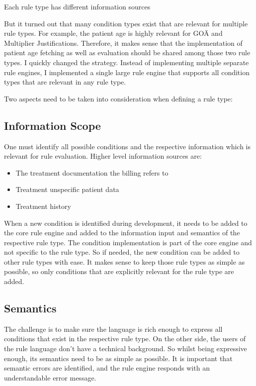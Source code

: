 Each rule type has different information sources

But it turned out that many condition types exist that are relevant for multiple rule types.
For example, the patient age is highly relevant for GOÄ and Multiplier Justifications.
Therefore,
it makes sense that the implementation of patient age fetching as well as evaluation should be shared among those two rule types.
I quickly changed the strategy.
Instead of implementing multiple separate rule engines,
I implemented a single large rule engine that supports all condition types that are relevant in any rule type.


Two aspects need to be taken into consideration when defining a rule type:

\subsection{Information Scope}
One must identify all possible conditions and the respective information which is relevant for rule evaluation.
Higher level information sources are:
\begin{itemize}
    \item The treatment documentation the billing refers to
    \item Treatment unspecific patient data
    \item Treatment history
\end{itemize}
When a new condition is identified during development,
it needs to be added to the core rule engine
and added to the information input and semantics of the respective rule type.
The condition implementation is part of the core engine and not specific to the rule type.
So if needed, the new condition can be added to other rule types with ease.
It makes sense to keep those rule types as simple as possible,
so only conditions that are explicitly relevant for the rule type are added.

\subsection{Semantics}
The challenge is to make sure the language is rich enough
to express all conditions that exist in the respective rule type.
On the other side, the users of the rule language don't have a technical background.
So whilst being expressive enough, its semantics need to be as simple as possible.
It is important that semantic errors are identified, and the rule engine responds with an understandable error message.

